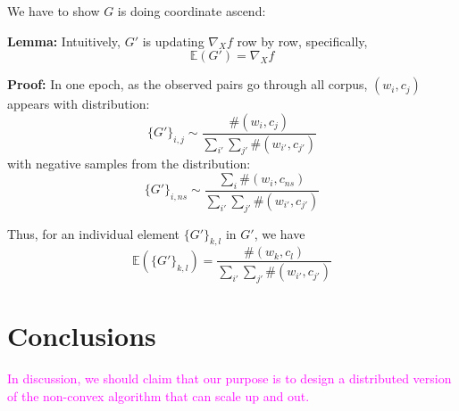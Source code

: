 \documentclass[letterpaper]{article} %
\begin{document}
We have to show $G$ is doing coordinate ascend:

\textbf{Lemma:}  Intuitively, $G'$ is updating $\nabla_X f$ row by row, specifically,
\begin{equation}
	\mathbb{E}(G')=\nabla_X f
\end{equation}

\textbf{Proof:} In one epoch, as the observed pairs go through all corpus, $(w_i,c_j)$ appears with distribution: \[\{G'\}_{i,j}\sim\frac{\#(w_i, c_j)}{\sum_{i'}\sum_{j'} \#(w_{i'}, c_{j'})}\]
with negative samples from the distribution:
 \[\{G'\}_{i,ns}\sim\frac{\sum_i\#(w_i, c_{ns})}{\sum_{i'}\sum_{j'} \#(w_{i'}, c_{j'})}\]
 
 Thus, for an individual element $\{G'\}_{k,l}$ in $G'$, we have
 \[\mathbb{E}(\{G'\}_{k,l})=\frac{\#(w_k, c_l)}{\sum_{i'}\sum_{j'} \#(w_{i'}, c_{j'})}\]
\section{Conclusions}
\textcolor{magenta}{In discussion, we should claim that our purpose is to design a distributed version of the non-convex algorithm that can scale up and out.}
 


\end{document}
